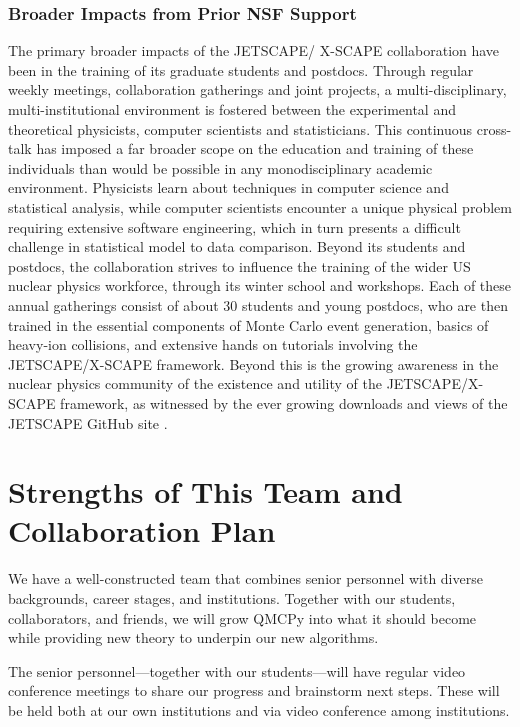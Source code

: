 \documentclass[11pt]{NSFamsart}
\begin{document}
\subsubsection{Broader Impacts from Prior NSF Support}
The primary broader impacts of the JETSCAPE/ X-SCAPE collaboration have been in the training of its graduate students and postdocs. Through regular weekly meetings, collaboration gatherings and joint projects, a multi-disciplinary, multi-institutional environment is fostered between the experimental and theoretical physicists, computer scientists and statisticians. This continuous cross-talk has imposed a far broader scope on the education and training of these individuals than would be possible in any monodisciplinary academic environment. Physicists learn about techniques in computer science and statistical analysis, while computer scientists encounter a unique physical problem requiring extensive software engineering, which in turn presents a difficult challenge in statistical model to data comparison. Beyond its students and postdocs, the collaboration strives to influence the training of the wider US nuclear physics workforce, through its winter school and workshops. Each of these annual gatherings consist of about 30 students and young postdocs, who are then trained in the essential components of Monte Carlo event generation, basics of heavy-ion collisions, and extensive hands on tutorials involving the JETSCAPE/X-SCAPE framework. Beyond this is the growing awareness in the nuclear physics community of the existence and utility of the JETSCAPE/X-SCAPE framework, as witnessed by the ever growing downloads and views of the JETSCAPE GitHub site \cite{jetscape}.

\section{Strengths of This Team and Collaboration Plan}
We have a well-constructed  team that combines senior personnel with diverse backgrounds, career stages, and institutions.  Together with our students, collaborators, and friends, we will grow QMCPy into what it should become while providing new theory to underpin our new algorithms.

The senior personnel---together with our students---will have regular video conference meetings to share our progress and brainstorm next steps. These will be held both at our own institutions and via video conference among institutions.
\end{document}
